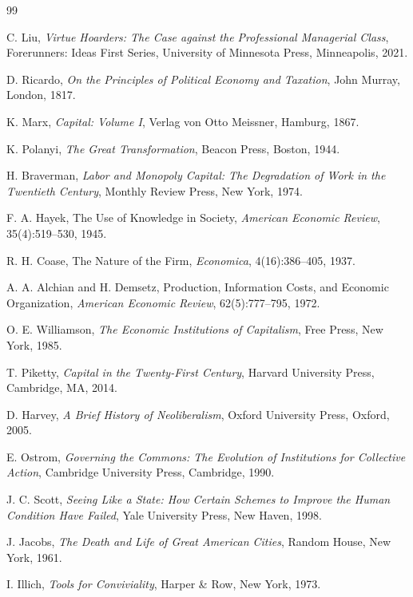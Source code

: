 \documentclass[12pt]{article}
\begin{document}
\begin{thebibliography}{99}

C. Liu,
\textit{Virtue Hoarders: The Case against the Professional Managerial Class},
Forerunners: Ideas First Series,
University of Minnesota Press, Minneapolis, 2021.

D. Ricardo,
\textit{On the Principles of Political Economy and Taxation},
John Murray, London, 1817.

K. Marx,
\textit{Capital: Volume I},
Verlag von Otto Meissner, Hamburg, 1867.

K. Polanyi,
\textit{The Great Transformation},
Beacon Press, Boston, 1944.

H. Braverman,
\textit{Labor and Monopoly Capital: The Degradation of Work in the Twentieth Century},
Monthly Review Press, New York, 1974.

F. A. Hayek,
The Use of Knowledge in Society,
\textit{American Economic Review}, 35(4):519--530, 1945.

R. H. Coase,
The Nature of the Firm,
\textit{Economica}, 4(16):386--405, 1937.

A. A. Alchian and H. Demsetz,
Production, Information Costs, and Economic Organization,
\textit{American Economic Review}, 62(5):777--795, 1972.

O. E. Williamson,
\textit{The Economic Institutions of Capitalism},
Free Press, New York, 1985.

T. Piketty,
\textit{Capital in the Twenty-First Century},
Harvard University Press, Cambridge, MA, 2014.

D. Harvey,
\textit{A Brief History of Neoliberalism},
Oxford University Press, Oxford, 2005.

E. Ostrom,
\textit{Governing the Commons: The Evolution of Institutions for Collective Action},
Cambridge University Press, Cambridge, 1990.

J. C. Scott,
\textit{Seeing Like a State: How Certain Schemes to Improve the Human Condition Have Failed},
Yale University Press, New Haven, 1998.

J. Jacobs,
\textit{The Death and Life of Great American Cities},
Random House, New York, 1961.

I. Illich,
\textit{Tools for Conviviality},
Harper \& Row, New York, 1973.


\end{thebibliography}
\end{document}
